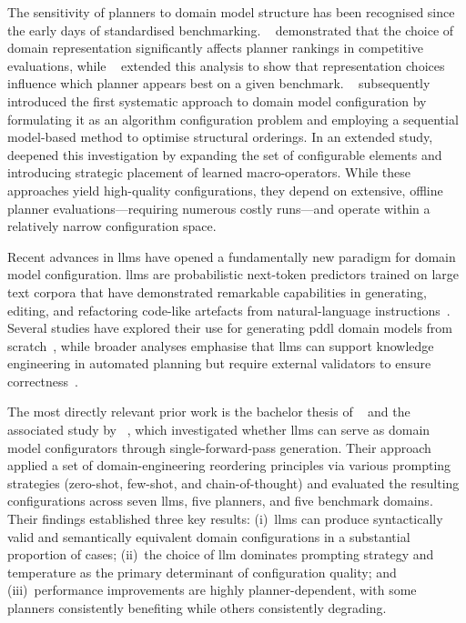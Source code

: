 The sensitivity of planners to domain model structure has been recognised since the early days of standardised benchmarking.
\citeauthor{HoweDahlman2002}~\cite{HoweDahlman2002} demonstrated that the choice of domain representation significantly affects planner rankings in competitive evaluations, while \citeauthor{RiddleHolteBarley2011}~\cite{RiddleHolteBarley2011} extended this analysis to show that representation choices influence which planner appears best on a given benchmark.
\citeauthor{Vallati2015}~\cite{Vallati2015} subsequently introduced the first systematic approach to domain model configuration by formulating it as an algorithm configuration problem and employing a sequential model-based method to optimise structural orderings.
In an extended study, \citeauthor{Vallati2021}~\cite{Vallati2021} deepened this investigation by expanding the set of configurable elements and introducing strategic placement of learned macro-operators.
While these approaches yield high-quality configurations, they depend on extensive, offline planner evaluations---requiring numerous costly runs---and operate within a relatively narrow configuration space.

Recent advances in \glspl{llm} have opened a fundamentally new paradigm for domain model configuration.
\glspl{llm} are probabilistic next-token predictors trained on large text corpora that have demonstrated remarkable capabilities in generating, editing, and refactoring code-like artefacts from natural-language instructions~\cite{Zhao2023, Minaee2024, Cassano2023}.
Several studies have explored their use for generating \gls{pddl} domain models from scratch~\cite{Oswald2024, Guan2023, Smirnov2024, Casciani2025, Huang2025}, while broader analyses emphasise that \glspl{llm} can support knowledge engineering in automated planning but require external validators to ensure correctness~\cite{Vallati2025, Georgievski2026}.

The most directly relevant prior work is the bachelor thesis of \citeauthor{Elis2025}~\cite{Elis2025} and the associated study by \citeauthor{Georgievski2025}~\cite{Georgievski2025}, which investigated whether \glspl{llm} can serve as domain model configurators through single-forward-pass generation.
Their approach applied a set of domain-engineering reordering principles via various prompting strategies (zero-shot, few-shot, and chain-of-thought) and evaluated the resulting configurations across seven \glspl{llm}, five planners, and five benchmark domains.
Their findings established three key results: (i)~\glspl{llm} can produce syntactically valid and semantically equivalent domain configurations in a substantial proportion of cases; (ii)~the choice of \gls{llm} dominates prompting strategy and temperature as the primary determinant of configuration quality; and (iii)~performance improvements are highly planner-dependent, with some planners consistently benefiting while others consistently degrading.

